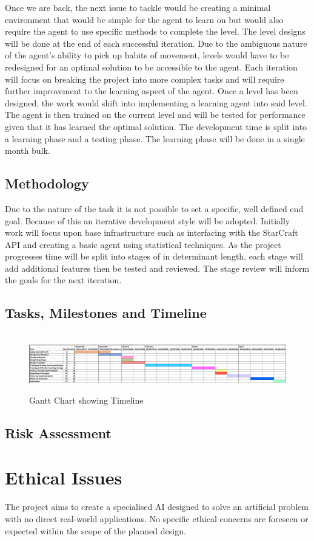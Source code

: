 \documentclass[12pt]{article}
\begin{document}
Once we are back, the next issue to tackle would be creating a minimal
environment that would be simple for the agent to learn on but would also
require the agent to use specific methods to complete the level. The level
designs will be done at the end of each successful iteration. Due to the
ambiguous nature of the agent’s ability to pick up habits of movement,
levels would have to be redesigned for an optimal solution to be accessible
to the agent. Each iteration will focus on breaking the project into more
complex tasks and will require further improvement to the learning aspect of
the agent. Once a level has been designed, the work would shift into
implementing a learning agent into said level. The agent is then trained
on the current level and will be tested for performance given that it has
learned the optimal solution. The development time is split into a learning
phase and a testing phase. The learning phase will be done in a single month bulk.

\subsection{Methodology}

Due to the nature of the task it is not possible to set a specific, well
defined end goal. Because of this an iterative development style will be adopted.
Initially work will focus upon base infrastructure such as interfacing with
the StarCraft API and creating a basic agent using statistical techniques.
As the project progresses time will be split into stages of in determinant length,
each stage will add additional features then be tested and reviewed.
The stage review will inform the goals for the next iteration.

\subsection{Tasks, Milestones and Timeline}

\begin{figure}[h]
    \hspace*{-1cm}\
    \includegraphics[width=1.1\textwidth]{gantt.png}
    \caption{Gantt Chart showing Timeline}
\end{figure}

\subsection{Risk Assessment}

\appendix
\section{Ethical Issues}
The project aims to create a specialised AI designed to solve an artificial
problem with no direct real-world applications.
No specific ethical concerns are foreseen or expected within the scope of the
planned design.

\printbibliography{}
\end{document}
